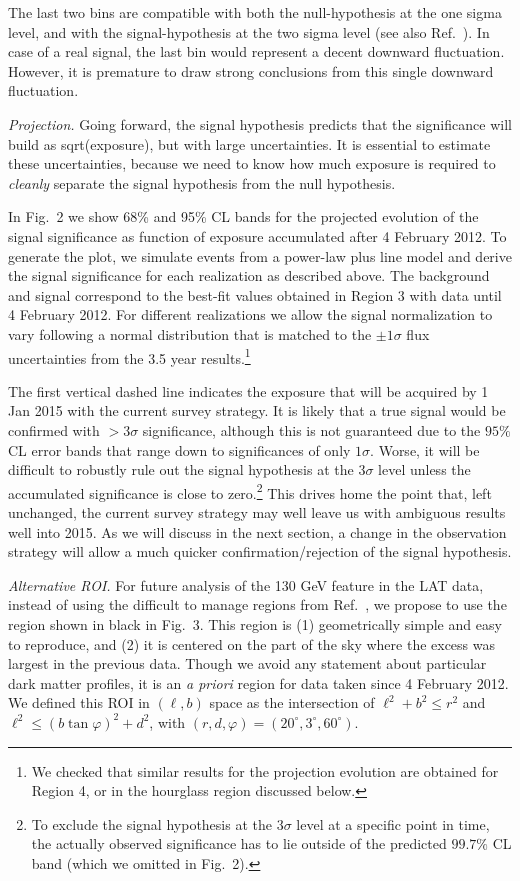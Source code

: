 \documentclass[aps,prd,superscriptaddress,nofootinbib,fixlfloat, 12pt]{revtex4-1}
\begin{document}
The last two bins are compatible with both the null-hypothesis at the one
sigma level, and with the signal-hypothesis at the two sigma level (see also
Ref.~\cite{Weniger:2013dya}). In case of a real signal, the last bin would
represent a decent downward fluctuation. However, it is premature to
draw strong conclusions from this single downward fluctuation.

\emph{Projection.} 
Going forward, the signal hypothesis predicts that the significance will build
as sqrt(exposure), but with large uncertainties.  It is essential to estimate
these uncertainties, because we need to know how much exposure is required to
\emph{cleanly} separate the signal hypothesis from the null hypothesis. 

In Fig.~2 we show 68\% and 95\% CL bands for the projected evolution of the
signal significance as function of exposure accumulated after 4 February 2012.
To generate the plot, we simulate events from a power-law plus line model and
derive the signal significance for each realization as described above. The
background and signal correspond to the best-fit values obtained in Region 3
with data until 4 February 2012.  For different realizations we allow the
signal normalization to vary following a normal distribution that is matched
to the $\pm1\sigma$ flux uncertainties from the 3.5 year results.\footnote{We
checked that similar results for the projection evolution are obtained for
Region 4, or in the hourglass region discussed below.}

The first vertical dashed line indicates the exposure that will be acquired by
1 Jan 2015 with the current survey strategy. It is likely that a true signal
would be confirmed with $>3\sigma$ significance, although this is not
guaranteed due to the $95\%$ CL error bands that range down to significances
of only $1\sigma$. Worse, it will be difficult to robustly rule out the signal
hypothesis at the $3\sigma$ level unless the accumulated significance is close
to zero.\footnote{To exclude the signal hypothesis at the $3\sigma$ level at a
specific point in time, the actually observed significance has to lie outside
of the predicted
$99.7\%$ CL band (which we omitted in Fig.~2).} This drives home the point
that, left unchanged, the current survey
strategy may well leave us with ambiguous results well into 2015.  As we will
discuss in the next section, a change in the observation strategy will allow a
much quicker confirmation/rejection of the signal hypothesis.
\medskip

\emph{Alternative ROI.} For future analysis of the 130 GeV feature in the LAT
data, instead of using the difficult to manage regions from
Ref.~\cite{Weniger:2012}, we propose to use the region shown in black in
Fig.~3. This region is (1) geometrically simple and easy to reproduce, and (2)
it is centered on the part of the sky where the excess was largest in the
previous data. Though we avoid any statement about particular dark matter
profiles, it is an \emph{a priori} region for data taken since 4 February
2012. We defined this ROI in $(\ell, b)$ space as the intersection of
$\ell^2+b^2\leq
r^2$ and $\ell^2\leq (b\tan\varphi)^2 + d^2$, with $(r, d, \varphi) =
(20^\circ, 3^\circ, 60^\circ)$. 
\end{document}
